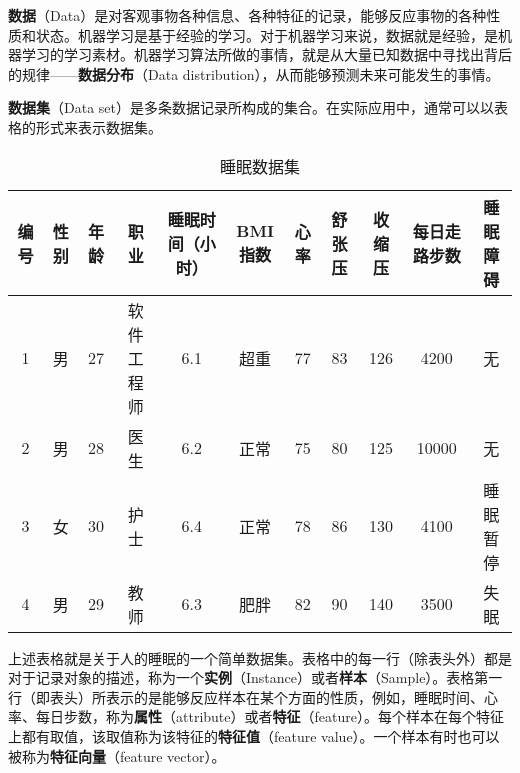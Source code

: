 
\textbf{数据}（Data）是对客观事物各种信息、各种特征的记录，能够反应事物的各种性质和状态。机器学习是基于经验的学习。对于机器学习来说，数据就是经验，是机器学习的学习素材。机器学习算法所做的事情，就是从大量已知数据中寻找出背后的规律——\textbf{数据分布}（Data distribution），从而能够预测未来可能发生的事情。

\textbf{数据集}（Data set）是多条数据记录所构成的集合。在实际应用中，通常可以以表格的形式来表示数据集。

\begin{table}[ht]
\centering
\caption{睡眠数据集}\label{tab_datast2}
\begin{tabular}{|c|c|c|c|c|c|c|c|c|c|c|}
\hline
编号 & 性别 & 年龄 & 职业 & 睡眠时间（小时） & BMI指数 & 心率 & 舒张压 & 收缩压 & 每日走路步数 & 睡眠障碍 \\\hline
1 & 男 & 27 & 软件工程师 & 6.1 & 超重 & 77 & 83 & 126 & 4200 & 无 \\
\hline
2 & 男 & 28 & 医生 & 6.2 & 正常 & 75 & 80 & 125 & 10000 & 无 \\
\hline
3 & 女 & 30 & 护士 & 6.4 & 正常 & 78 & 86 & 130 & 4100 & 睡眠暂停 \\
\hline
4 & 男 & 29 & 教师 & 6.3 & 肥胖 & 82 & 90 & 140 & 3500 & 失眠 \\
\hline
\end{tabular}
\end{table}

上述表格就是关于人的睡眠的一个简单数据集。表格中的每一行（除表头外）都是对于记录对象的描述，称为一个\textbf{实例}（Instance）或者\textbf{样本}（Sample）。表格第一行（即表头）所表示的是能够反应样本在某个方面的性质，例如，睡眠时间、心率、每日步数，称为\textbf{属性}（attribute）或者\textbf{特征}（feature）。每个样本在每个特征上都有取值，该取值称为该特征的\textbf{特征值}（feature value）。一个样本有时也可以被称为\textbf{特征向量}（feature vector）。

